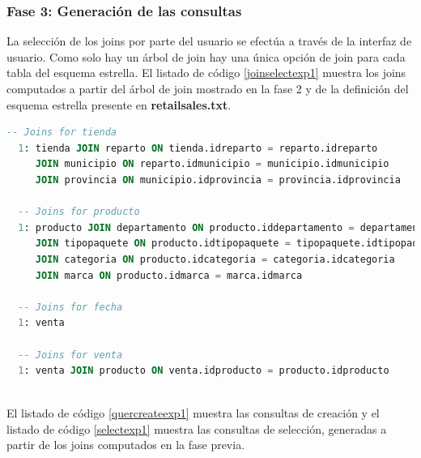 \subsubsection{Fase 3: Generaci\'on de las consultas}

La selección de los joins por parte del usuario se efectúa a través de la interfaz de usuario. 
Como solo hay un \'arbol de join hay una \'unica opción de join para 
cada tabla del esquema estrella. El listado de código \ref{joinselectexp1} muestra los joins 
computados a partir del \'arbol de join mostrado en la fase 2 y de la definición del esquema estrella 
presente en \textbf{retailsales.txt}.

\begin{lstlisting}[label={joinselectexp1}, caption={Joins computados para el experimento 1}, language={sql}]
  -- Joins for tienda
  1: tienda JOIN reparto ON tienda.idreparto = reparto.idreparto 
     JOIN municipio ON reparto.idmunicipio = municipio.idmunicipio 
     JOIN provincia ON municipio.idprovincia = provincia.idprovincia

  -- Joins for producto
  1: producto JOIN departamento ON producto.iddepartamento = departamento.iddepartamento 
     JOIN tipopaquete ON producto.idtipopaquete = tipopaquete.idtipopaquete 
     JOIN categoria ON producto.idcategoria = categoria.idcategoria 
     JOIN marca ON producto.idmarca = marca.idmarca

  -- Joins for fecha
  1: venta

  -- Joins for venta
  1: venta JOIN producto ON venta.idproducto = producto.idproducto
  
\end{lstlisting}

El listado de código \ref{quercreateexp1} muestra las consultas de creación y el listado de código 
\ref{selectexp1} muestra las consultas de selección, generadas a partir de los joins computados en 
la fase previa.

